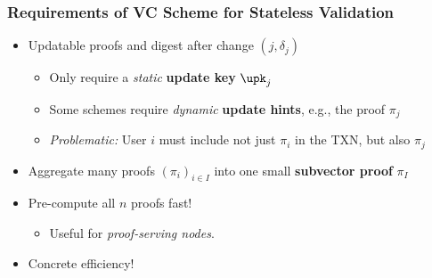 
\begin{frame}
    \frametitle{Requirements of VC Scheme for Stateless Validation}

    \pause
    \begin{itemize}
        \item \alert{Updatable} proofs and digest after change $(j,\delta_j)$\pause
        \begin{itemize}
            \item Only require a \textit{static} \textbf{update key} $\upk_j$\pause
            \item Some schemes require \textit{dynamic} \textbf{update hints}, e.g., the proof $\pi_j$\pause
            \item \textit{Problematic:} User $i$ must include not just $\pi_i$ in the TXN, but also $\pi_j$\pause
        \end{itemize}
        \item \alert{Aggregate} many proofs $(\pi_i)_{i\in I}$ into one small \textbf{subvector proof} $\pi_I$\pause
        \item \alert{Pre-compute} all $n$ proofs fast!\pause
        \begin{itemize}
            \item Useful for \textit{proof-serving nodes}.\pause
        \end{itemize}
        \item \alert{Concrete efficiency!}%
        \end{itemize}
\end{frame}
